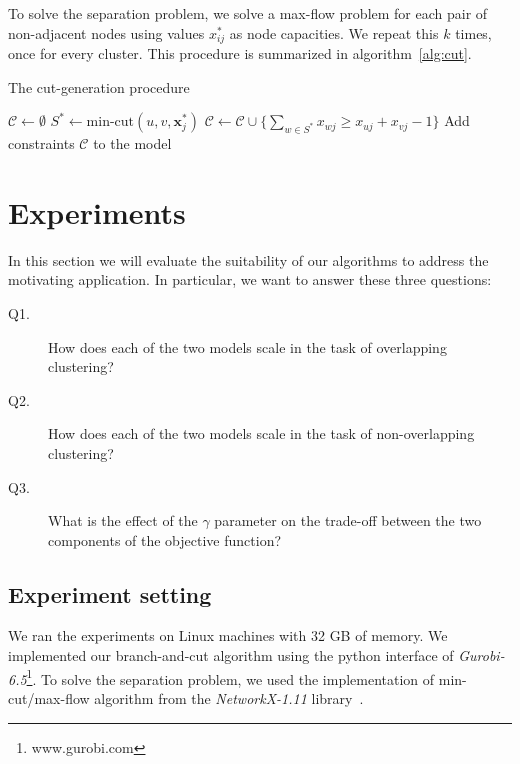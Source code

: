 \documentclass[conference,compsoc]{IEEEtran}
\begin{document}
To solve the separation problem, we solve a max-flow problem for each
pair of non-adjacent nodes using values $x^*_{ij}$ as node capacities. We repeat this $k$ times, once for every cluster. This procedure is summarized in algorithm~\ref{alg:cut}.

\begin{algorithm}
\centering
\caption{The cut-generation procedure}
\label{alg:cut}
\begin{algorithmic}[1]
\State $\mathcal{C} \gets \emptyset$
		\State $S^* \gets \text{min-cut}(u, v, {\mathbf{x}}^{*}_j)$ 
			\State $\mathcal{C} \gets \mathcal{C} \cup \{\sum_{w \in S^*} x_{wj} \geq x_{uj} + x_{vj} - 1\}$
		\EndIf
	\EndFor
\EndFor
\State Add constraints $\mathcal{C}$ to the model
\end{algorithmic}
\end{algorithm}


\section{Experiments}
\label{sec:experiments}

In this section we will evaluate the suitability of our algorithms to address the motivating application. In particular, we want to answer these three questions:

\begin{description}
\item[Q1.] How does each of the two models scale in the task of overlapping clustering?
\item[Q2.] How does each of the two models scale in the task of non-overlapping clustering?
\item[Q3.] What is the effect of the $\gamma$ parameter on the trade-off between the two components of the objective function?
\end{description}


\subsection{Experiment setting}
We ran the experiments on Linux machines with 32 GB of memory. We implemented our branch-and-cut algorithm using the python interface
of \emph{Gurobi-6.5}\footnote{www.gurobi.com}. To solve the separation problem, we used the implementation of min-cut/max-flow algorithm from the \emph{NetworkX-1.11} library~\cite{NetworkX}. 
\end{document}
